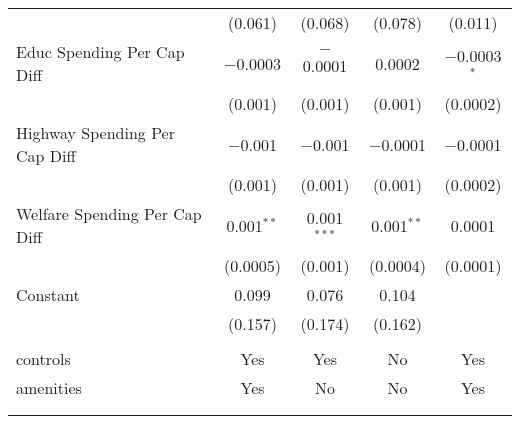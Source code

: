 \begin{table}[!htbp]
\begin{tabular}{@{\extracolsep{5pt}}lcccc}
  & (0.061) & (0.068) & (0.078) & (0.011) \\ 
  Educ Spending Per Cap Diff & $-$0.0003 & $-$0.0001 & 0.0002 & $-$0.0003$^{*}$ \\ 
  & (0.001) & (0.001) & (0.001) & (0.0002) \\ 
  Highway Spending Per Cap Diff & $-$0.001 & $-$0.001 & $-$0.0001 & $-$0.0001 \\ 
  & (0.001) & (0.001) & (0.001) & (0.0002) \\ 
  Welfare Spending Per Cap Diff & 0.001$^{**}$ & 0.001$^{***}$ & 0.001$^{**}$ & 0.0001 \\ 
  & (0.0005) & (0.001) & (0.0004) & (0.0001) \\ 
  Constant & 0.099 & 0.076 & 0.104 &  \\ 
  & (0.157) & (0.174) & (0.162) &  \\ 
 \hline \\[-1.8ex] 
controls & Yes & Yes & No & Yes \\ 
amenities & Yes & No & No & Yes \\ 
\hline \\[-1.8ex] 
\hline 
\hline \\[-1.8ex] 
\end{tabular} 
\end{table} 
